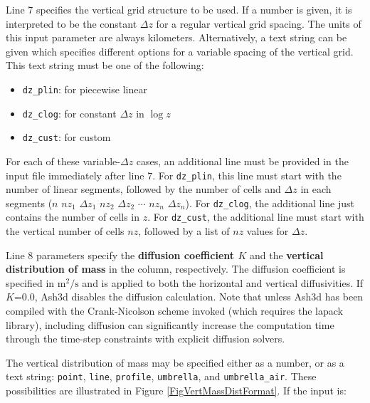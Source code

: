 Line 7 specifies the vertical grid structure to be used.  If a number is
given, it is interpreted to be the constant $\Delta z$ for a regular vertical
grid spacing.
The units of this input parameter are always kilometers.
Alternatively, a text string can be given which specifies
different options for a variable spacing of the vertical grid.  This text
string must be one of the following:
\begin{itemize}
\item \texttt{dz\_plin}: for piecewise linear
\item \texttt{dz\_clog}: for constant $\Delta z$ in $\log z$
\item \texttt{dz\_cust}: for custom
\end{itemize}
For each of these variable-$\Delta z$ cases, an additional line must be
provided in the input file immediately after line 7.  For \texttt{dz\_plin},
this line must start with the number of linear segments, followed by the
number of cells and $\Delta z$ in each segments
($n$ $nz_1$ $\Delta z_1$ $nz_2$ $\Delta z_2$ $\cdots$ $nz_n$ $\Delta z_n$).
For \texttt{dz\_clog}, the additional line just contains the number of cells
in $z$.
For \texttt{dz\_cust}, the additional line must start with the vertical
number of cells $nz$, followed by a list of $nz$ values for
$\Delta z$.

Line 8 parameters specify the \textbf{diffusion coefficient $K$} and the \textbf{vertical distribution of mass} in the column, respectively. The diffusion coefficient is specified in $\mathrm{m^2/s}$ and is applied to both the horizontal and vertical diffusivities.  If $K$=0.0,  Ash3d disables the diffusion calculation.  Note that unless Ash3d has been
compiled with the Crank-Nicolson scheme invoked (which requires the lapack library), including diffusion can significantly increase the computation time through the time-step constraints with explicit diffusion solvers.

The vertical distribution of mass may be specified either as a number, or as a text string: \texttt{point}, \texttt{line},
\texttt{profile}, \texttt{umbrella}, and \texttt{umbrella\_air}.  These possibilities are illustrated in Figure \ref{FigVertMassDistFormat}.  If the input is:

